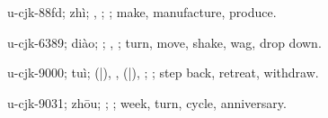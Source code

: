 \begin{multicols}{2}
{\cjkgGlue{}u-cjk-88fd; zhì; \cjkgGlue{}, \cjkgGlue{}; \cjkgGlue{}; make, manufacture, produce.

\cjkgGlue{}u-cjk-6389; diào; \cjkgGlue{}\cjkgGlue{}\cjkgGlue{}; \cjkgGlue{}, \cjkgGlue{}; turn, move, shake, wag, drop down.

\cjkgGlue{}u-cjk-9000; tuì; \cjkgGlue{}\cjkgGlue{}(\cjkgGlue{}|\cjkgGlue{}), \cjkgGlue{}\cjkgGlue{}\cjkgGlue{}, \cjkgGlue{}\cjkgGlue{}(\cjkgGlue{}|\cjkgGlue{}), \cjkgGlue{}\cjkgGlue{}\cjkgGlue{}; \cjkgGlue{}; step back, retreat, withdraw.

\cjkgGlue{}u-cjk-9031; zhōu; \cjkgGlue{}; \cjkgGlue{}; week, turn, cycle, anniversary.

}
\end{multicols}
